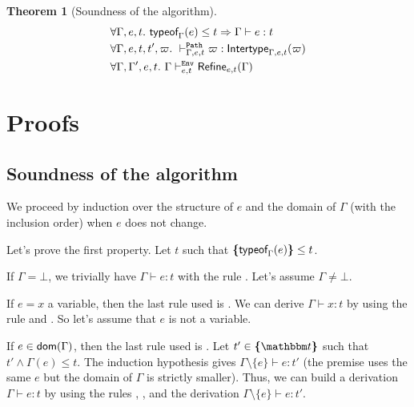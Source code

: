 \documentclass[a4paper]{article}
\theoremstyle{definition}
\newtheorem{theorem}{Theorem}
\newtheorem{lemma}{Lemma}
\begin{document}
%

  \begin{theorem}[Soundness of the algorithm]
    \begin{align*}
      &\forall \Gamma, e, t.\ \textsf{typeof}_{\Gamma}(e) \leq t \Rightarrow \Gamma \vdash e:t\\
      &\forall \Gamma, e, t, t', \varpi.\ \vdash^{\texttt{Path}}_{\Gamma,e,t} \varpi:\textsf{Intertype}_{\Gamma,e,t} (\varpi)\\
      &\forall \Gamma, \Gamma', e, t.\ \Gamma \vdash^{\texttt{Env}}_{e,t} \textsf{Refine}_{e,t}(\Gamma)
    \end{align*}
  \end{theorem}

  \section{Proofs}

  \subsection{Soundness of the algorithm}

  We proceed by induction over the structure of $e$
  and the domain of $\Gamma$ (with the inclusion order) when $e$ does not change.

  Let's prove the first property.
  Let $t$ such that $\textbf{\textup{\{}}\textsf{typeof}_{\Gamma}(e)\textbf{\textup{\}}} \leq t$.

  If $\Gamma = \bot$, we trivially have $\Gamma \vdash e:t$ with the rule .
  Let's assume $\Gamma \neq \bot$.

  If $e=x$ a variable, then the last rule used is .
  We can derive $\Gamma \vdash x:t$ by using the rule  and .
  So let's assume that $e$ is not a variable.

  If $e\in\textsf{dom}(\Gamma)$, then the last rule used is .
  Let $t'\in\tsint{\ts}$ such that $t'\land\Gamma(e)\leq t$.
  The induction hypothesis gives $\Gamma\setminus\{e\} \vdash e:t'$
  (the premise uses the same $e$ but the domain of $\Gamma$ is strictly smaller).
  Thus, we can build a derivation $\Gamma \vdash e:t$ by using the rules , ,
   and the derivation $\Gamma\setminus\{e\} \vdash e:t'$.
\end{document}
